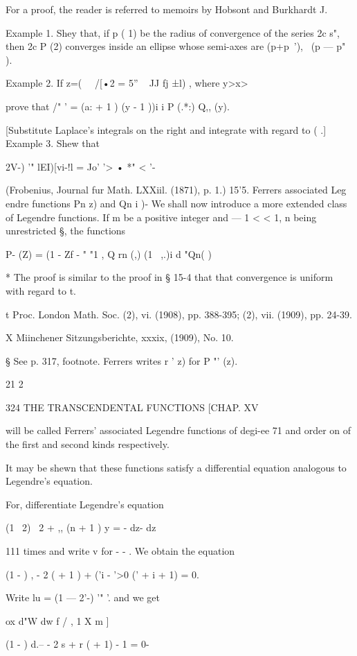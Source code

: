 {{{For a proof, the reader is referred to memoirs by Hobsont and
Burkhardt J.

Example 1. Shey that, if p ( 1) be the radius of convergence of the
series 2c s", then 2c P (2) converges inside an ellipse whose
semi-axes are (p+p~'), \ (p — p" ).

Example 2. If z=( \ \ /[•2 = 5'' ~ JJ fj ±l) , where y>x>\,

prove that /" ' = (a: + 1 ) (y - 1 ))i i P (.*:) Q,, (y).

[Substitute Laplace's integrals on the right and integrate with regard
to ( .] Example 3. Shew that

2V-) '" lEI)[vi-!l = Jo' '> • *" < '-

(Frobenius, Journal fur Math. LXXiil. (1871), p. 1.) 15'5. Ferrers
associated Leg endre functions Pn z) and Qn i )- We shall now
introduce a more extended class of Legendre functions. If m be a
positive integer and — 1 < < 1, n being unrestricted §, the functions

P- (Z) = (1 - Zf - " "1 , Q rn (,) (1 \ ,.)i d "Qn( )

* The proof is similar to the proof in § 15-4 that that convergence is
uniform with regard to t.

t Proc. London Math. Soc. (2), vi. (1908), pp. 388-395; (2), vii.
(1909), pp. 24-39.

X Miinchener Sitzungsberichte, xxxix, (1909), No. 10.

§ See p. 317, footnote. Ferrers writes r ' z) for P "' (z).

21 2



324 THE TRANSCENDENTAL FUNCTIONS [CHAP. XV

will be called Ferrers' associated Legendre functions of degi-ee 71
and order on of the first and second kinds respectively.

It may be shewn that these functions satisfy a differential equation
analogous to Legendre's equation.

For, differentiate Legendre's equation

(1 \ 2) \ 2 + ,, (n + 1 ) y = - dz- dz

111 times and write v for - - . We obtain the equation

(1 - ) , - 2 ( + 1 ) + ('i - '>0 (' + i + 1) = 0.

Write lu = (1 — 2'-) '" '. and we get

ox d"W dw f / , 1 X m ]

(1 - ) d.-- - 2 s + r ( + 1) - 1 = 0-

}}}
